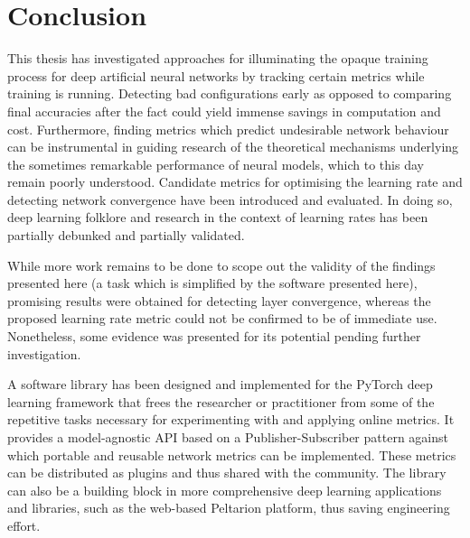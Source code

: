 \chapter{Conclusion}%

This thesis has investigated approaches for illuminating the opaque training
process for deep artificial neural networks by tracking certain metrics while
training is running. Detecting bad configurations early as opposed to comparing
final accuracies after the fact could yield immense savings in computation and
cost.  Furthermore, finding metrics which predict undesirable network behaviour
can be instrumental in guiding research of the theoretical mechanisms underlying
the sometimes remarkable performance of neural models, which to this day remain
poorly understood. Candidate metrics for optimising the learning rate and
detecting network convergence have been introduced and evaluated. In doing so,
deep learning folklore and research in the context of learning rates has been
partially debunked and partially validated.

While more work remains to be done to scope out the validity of the findings
presented here (a task which is simplified by the software presented here),
promising results were obtained for detecting layer convergence, whereas the
proposed learning rate metric could not be confirmed to be of immediate use.
Nonetheless, some evidence was presented for its potential pending further
investigation.

A software library has been designed and implemented for the PyTorch deep
learning framework that frees the researcher or practitioner from some of the
repetitive tasks necessary for experimenting with and applying online metrics.
It provides a model-agnostic API based on a Publisher-Subscriber pattern against
which portable and reusable network metrics can be implemented. These metrics
can be distributed as plugins and thus shared with the community. The library
can also be a building block in more comprehensive deep learning applications
and libraries, such as the web-based Peltarion platform, thus saving engineering
effort.
